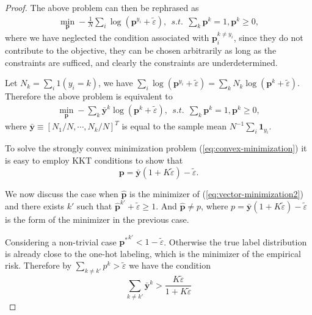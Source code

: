 \begin{proof}
The above problem can then be rephrased as
\begin{equation}
\begin{aligned}
    \min_{\mathbf{p}} - \frac{1}{N} \sum_{i} \log( {\mathbf{p}}^{y_i} + \tilde{\varepsilon}),~~ s.t.~~\sum_k \mathbf{p}^k = 1, \mathbf{p}^k \ge 0,
\end{aligned}
\end{equation}
where we have neglected the condition associated with $\mathbf{p}_i^{k\ne y_i}$, since they do not contribute to the objective, they can be chosen arbitrarily as long as the constraints are sufficed, and clearly the constraints are underdetermined.

Let $N_k = \sum_i 1(y_i = k)$, we have $\sum_i \log (\mathbf{p}^{y_i} + \tilde{\varepsilon}) = \sum_k N_k \log (\mathbf{p}^k + \tilde{\varepsilon})$. Therefore the above problem is equivalent to
\begin{equation}
\begin{aligned}
    \label{eq:convex-minimization}
    \min_{\mathbf{p}}- \sum_k \mathbf{\bar{y}}^k \log (\mathbf{p}^k + \tilde{\varepsilon}),~~ s.t.~~\sum_k \mathbf{p}^k = 1, \mathbf{p}^k \ge 0,
\end{aligned}
\end{equation}
where $\mathbf{\bar{y}} \equiv [N_1 / N, \cdots, N_k / N]^T $ is equal to the sample mean $N^{-1}\sum_i \mathbf{1}_{y_i}$. 

To solve the strongly convex minimization problem (\ref{eq:convex-minimization}) it is easy to employ KKT conditions to show that  
$$ \mathbf{p} = \mathbf{\bar{y}} (1 + K\tilde{\varepsilon}) - \tilde{\varepsilon}. 
$$

 We now discuss the case when $\mathbf{\hat{p}}$ is the minimizer of (\ref{eq:vector-minimization2}) and there exists $k'$ such that $\mathbf{\hat{p}}^{k'} + \tilde{\varepsilon} \ge 1$. And $\mathbf{\hat{p}}\ne p$, where $p = \mathbf{\bar{y}}(1+K\tilde{\varepsilon}) - \tilde{\varepsilon}$ is the form of the minimizer in the previous case.

Considering a non-trivial case $\mathbf{p^*}^{k'} < 1 - \tilde{\varepsilon}$. Otherwise the true label distribution is already close to the one-hot labeling, which is the minimizer of the empirical risk. Therefore by $\sum_{k\ne k'} {p}^{k} > \tilde{\varepsilon}$ we have the condition
\begin{equation}
    \sum_{k\ne k'}\mathbf{\bar{y}}^k >  \frac{K\tilde{\varepsilon}}{1 + K\tilde{\varepsilon}}
\end{equation}



\end{proof}
